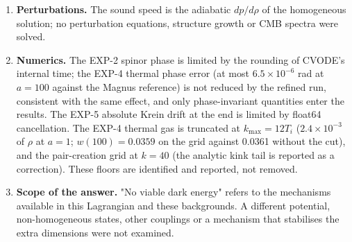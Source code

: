 \documentclass[11pt]{article}
\begin{document}
\begin{enumerate}
\item \textbf{Perturbations.} The sound speed is the adiabatic $dp/d\rho$ of the homogeneous solution; no perturbation equations, structure growth or CMB spectra were solved.
\item \textbf{Numerics.} The EXP-2 spinor phase is limited by the rounding of CVODE's internal time; the EXP-4 thermal phase error (at most $6.5\times10^{-6}$ rad at $a=100$ against the Magnus reference) is not reduced by the refined run, consistent with the same effect, and only phase-invariant quantities enter the results. The EXP-5 absolute Krein drift at the end is limited by float64 cancellation. The EXP-4 thermal gas is truncated at $k_{\max}=12T_i$ ($2.4\times10^{-3}$ of $\rho$ at $a=1$; $w(100)=0.0359$ on the grid against 0.0361 without the cut), and the pair-creation grid at $k=40$ (the analytic kink tail is reported as a correction). These floors are identified and reported, not removed.
\item \textbf{Scope of the answer.} "No viable dark energy" refers to the mechanisms available in this Lagrangian and these backgrounds. A different potential, non-homogeneous states, other couplings or a mechanism that stabilises the extra dimensions were not examined.
\end{enumerate}
\end{document}
